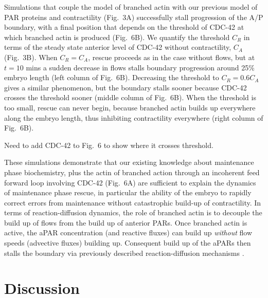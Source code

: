 \documentclass[11pt]{article}
\newcommand{\red}[1]{\color{red}#1\normalcolor}
\newcommand{\6}[1]{#1_{\text{6}}}
\newcommand{\3}[1]{#1_{\text{3}}}
\begin{document}
Simulations that couple the model of branched actin with our previous model of PAR proteins and contractility (Fig.\ 3A) successfully stall progression of the A/P boundary, with a final position that depends on the threshold of CDC-42 at which branched actin is produced (Fig.\ 6B). We quantify the threshold $C_R$ in terms of the steady state anterior level of CDC-42 without contractility, $C_A$ (Fig.\ 3B). When $C_R = C_A$, rescue proceeds as in the case without flows, but at $t=10$ mins a sudden decrease in flows stalls boundary progression around 25\% embryo length (left column of Fig.\ 6B). Decreasing the threshold to $C_R = 0.6C_A$ gives a similar phenomenon, but the boundary stalls sooner because CDC-42 crosses the threshold sooner (middle column of Fig.\ 6B). When the threshold is too small, rescue can never begin, because branched actin builds up everywhere along the embryo length, thus inhibiting contractility everywhere (right column of Fig.\ 6B). 

\red{Need to add CDC-42 to Fig.\ 6 to show where it crosses threshold.}

These simulations demonstrate that our existing knowledge about maintenance phase biochemistry, plus the actin of branched action through an incoherent feed forward loop involving CDC-42 (Fig.\ 6A) are sufficient to explain the dynamics of maintenance phase rescue, in particular the ability of the embryo to rapidly correct errors from maintenance without catastrophic build-up of contractility. In terms of reaction-diffusion dynamics, the role of branched actin is to decouple the build up of flows from the build up of anterior PARs. Once branched actin is active, the aPAR concentration (and reactive fluxes) can build up \emph{without} flow speeds (advective fluxes) building up. Consequent build up of the aPARs then stalls the boundary via previously described reaction-diffusion mechanisms \citep{mori2008wave,goehring2011polarization}.


\section*{Discussion}
\end{document}
